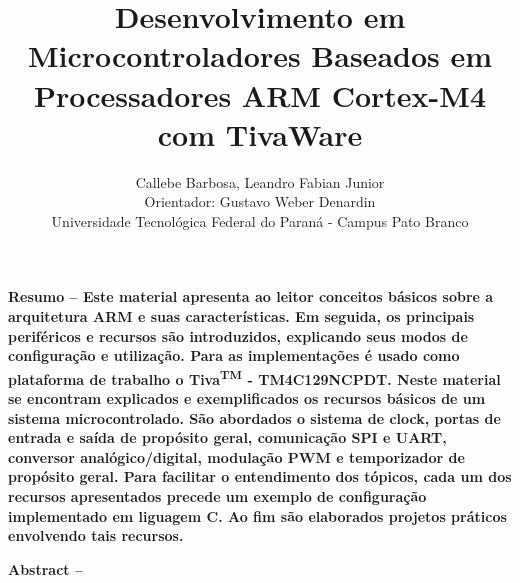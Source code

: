 \documentclass[10pt,a4paper]{article}
\begin{document}
\title{Desenvolvimento em Microcontroladores Baseados em Processadores ARM Cortex-M4 com TivaWare}

\author{Callebe Barbosa,  Leandro Fabian Junior
\vspace{0.2cm}
\\ Orientador: Gustavo Weber Denardin
\vspace{0.2cm}
\\\normalsize Universidade Tecnológica Federal do Paraná - Campus Pato Branco}

\maketitle

\vspace{10pt} {\textbf{Resumo -- Este material apresenta ao leitor conceitos básicos sobre a arquitetura ARM e suas características. Em seguida, os principais periféricos e recursos são introduzidos, explicando seus modos de configuração e utilização. Para as implementações é usado como plataforma de trabalho o Tiva\textsuperscript{TM} - TM4C129NCPDT. Neste material se encontram explicados e exemplificados os recursos básicos de um sistema microcontrolado. São abordados o sistema de clock, portas de entrada e saída de propósito geral, comunicação SPI e UART, conversor analógico/digital, modulação PWM e temporizador de propósito geral. Para facilitar o entendimento dos tópicos, cada um dos recursos apresentados precede um exemplo de configuração implementado em liguagem C. Ao fim são elaborados projetos práticos envolvendo tais recursos.}}


\vspace{10pt} {\textbf{Abstract -- }}



\vspace{0.5cm}



\end{document}
